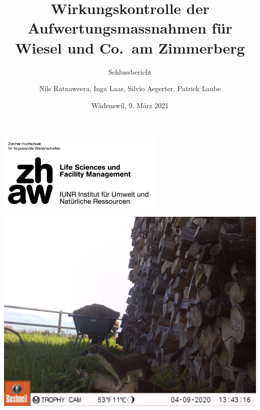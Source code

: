 \documentclass[
  oneside]{scrbook}
\title{Wirkungskontrolle der Aufwertungsmassnahmen für Wiesel und Co.~am Zimmerberg}
\subtitle{Schlussbericht}
\author{Nils Ratnaweera, Inga Laas, Silvio Aegerter, Patrick Laube}
\date{Wädenswil, 9. März 2021}
\begin{document}
\maketitle


\makeatletter
\begin{titlepage}

\thispagestyle{empty}
\includegraphics[width=0.6\textwidth]{images/zhaw_lsfm_iunr_schwarz.jpg}

\begin{center}

\includegraphics{images/Hermelin_Str116_WK02.JPG}

\vspace{10pt}

{\huge \@title}

\vspace{30pt}

% 



\end{center}



\begin{flushleft}

\begin{minipage}{21cm}
\vspace{10cm}



\end{minipage}
\end{flushleft}
\end{titlepage}
\end{document}
